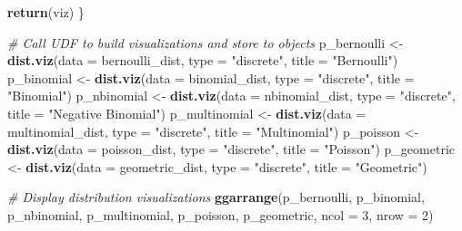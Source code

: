\documentclass[]{book}
\newenvironment{Shaded}{\begin{snugshade}}{\end{snugshade}}
\newcommand{\CommentTok}[1]{\textcolor[rgb]{0.56,0.35,0.01}{\textit{#1}}}
\newcommand{\DataTypeTok}[1]{\textcolor[rgb]{0.13,0.29,0.53}{#1}}
\newcommand{\DecValTok}[1]{\textcolor[rgb]{0.00,0.00,0.81}{#1}}
\newcommand{\KeywordTok}[1]{\textcolor[rgb]{0.13,0.29,0.53}{\textbf{#1}}}
\newcommand{\NormalTok}[1]{#1}
\newcommand{\StringTok}[1]{\textcolor[rgb]{0.31,0.60,0.02}{#1}}
\begin{document}
\begin{Shaded}
\begin{Highlighting}[]
  \KeywordTok{return}\NormalTok{(viz)}
\NormalTok{\}}

\CommentTok{# Call UDF to build visualizations and store to objects}
\NormalTok{p_bernoulli <-}\StringTok{ }\KeywordTok{dist.viz}\NormalTok{(}\DataTypeTok{data =}\NormalTok{ bernoulli_dist, }\DataTypeTok{type =} \StringTok{"discrete"}\NormalTok{, }\DataTypeTok{title =} \StringTok{"Bernoulli"}\NormalTok{)}
\NormalTok{p_binomial <-}\StringTok{ }\KeywordTok{dist.viz}\NormalTok{(}\DataTypeTok{data =}\NormalTok{ binomial_dist, }\DataTypeTok{type =} \StringTok{"discrete"}\NormalTok{, }\DataTypeTok{title =} \StringTok{"Binomial"}\NormalTok{)}
\NormalTok{p_nbinomial <-}\StringTok{ }\KeywordTok{dist.viz}\NormalTok{(}\DataTypeTok{data =}\NormalTok{ nbinomial_dist, }\DataTypeTok{type =} \StringTok{"discrete"}\NormalTok{, }\DataTypeTok{title =} \StringTok{"Negative Binomial"}\NormalTok{)}
\NormalTok{p_multinomial <-}\StringTok{ }\KeywordTok{dist.viz}\NormalTok{(}\DataTypeTok{data =}\NormalTok{ multinomial_dist, }\DataTypeTok{type =} \StringTok{"discrete"}\NormalTok{, }\DataTypeTok{title =} \StringTok{"Multinomial"}\NormalTok{)}
\NormalTok{p_poisson <-}\StringTok{ }\KeywordTok{dist.viz}\NormalTok{(}\DataTypeTok{data =}\NormalTok{ poisson_dist, }\DataTypeTok{type =} \StringTok{"discrete"}\NormalTok{, }\DataTypeTok{title =} \StringTok{"Poisson"}\NormalTok{)}
\NormalTok{p_geometric <-}\StringTok{ }\KeywordTok{dist.viz}\NormalTok{(}\DataTypeTok{data =}\NormalTok{ geometric_dist, }\DataTypeTok{type =} \StringTok{"discrete"}\NormalTok{, }\DataTypeTok{title =} \StringTok{"Geometric"}\NormalTok{)}
  
\CommentTok{# Display distribution visualizations}
\KeywordTok{ggarrange}\NormalTok{(p_bernoulli, p_binomial, p_nbinomial, p_multinomial, p_poisson, p_geometric,}
          \DataTypeTok{ncol =} \DecValTok{3}\NormalTok{, }\DataTypeTok{nrow =} \DecValTok{2}\NormalTok{)}
\end{Highlighting}
\end{Shaded}
\end{document}
